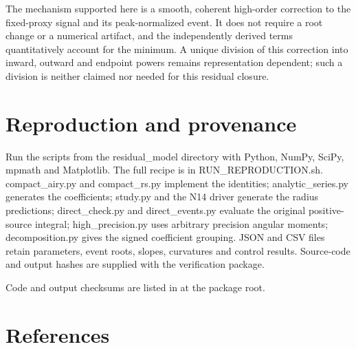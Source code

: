 \documentclass[11pt]{article}
\begin{document}
The mechanism supported here is a smooth, coherent high-order correction
to the fixed-proxy signal and its peak-normalized event. It does not
require a root change or a numerical artifact, and the independently
derived terms quantitatively account for the minimum. A unique division
of this correction into inward, outward and endpoint powers remains
representation dependent; such a division is neither claimed nor needed
for this residual closure.

\section{Reproduction and provenance}\label{reproduction-and-provenance}

Run the scripts from the residual\_model directory with
Python, NumPy, SciPy, mpmath and Matplotlib. The full recipe is in
RUN\_REPRODUCTION.sh. compact\_airy.py and compact\_rs.py implement the
identities; analytic\_series.py generates the coefficients; study.py and
the N14 driver generate the radius predictions; direct\_check.py and
direct\_events.py evaluate the original positive-source integral;
high\_precision.py uses arbitrary precision angular moments;
decomposition.py gives the signed coefficient grouping. JSON and CSV
files retain parameters, event roots, slopes, curvatures and control
results. Source-code and output hashes are supplied with the
verification package.

Code and output checksums are listed in 
at the package root.

\section{References}\label{references}
\end{document}
